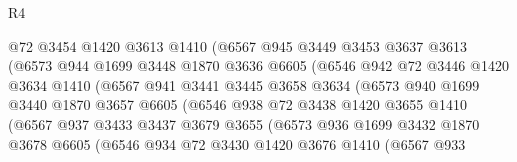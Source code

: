 \begin{lexlean}{R4}
\begin{coremodule}
                        @72
                        @3454
                        @1420
                        @3613
                        @1410
                        (@6567
                          @945
                          @3449
                          @3453
                          @3637
                          @3613
                          (@6573
                            @944
                            @1699
                            @3448
                            @1870
                            @3636
                            @6605
                            (@6546
                              @942
                              @72
                              @3446
                              @1420
                              @3634
                              @1410
                              (@6567
                                @941
                                @3441
                                @3445
                                @3658
                                @3634
                                (@6573
                                  @940
                                  @1699
                                  @3440
                                  @1870
                                  @3657
                                  @6605
                                  (@6546
                                    @938
                                    @72
                                    @3438
                                    @1420
                                    @3655
                                    @1410
                                    (@6567
                                      @937
                                      @3433
                                      @3437
                                      @3679
                                      @3655
                                      (@6573
                                        @936
                                        @1699
                                        @3432
                                        @1870
                                        @3678
                                        @6605
                                        (@6546
                                          @934
                                          @72
                                          @3430
                                          @1420
                                          @3676
                                          @1410
                                          (@6567
                                            @933

\end{coremodule}
\end{lexlean}
